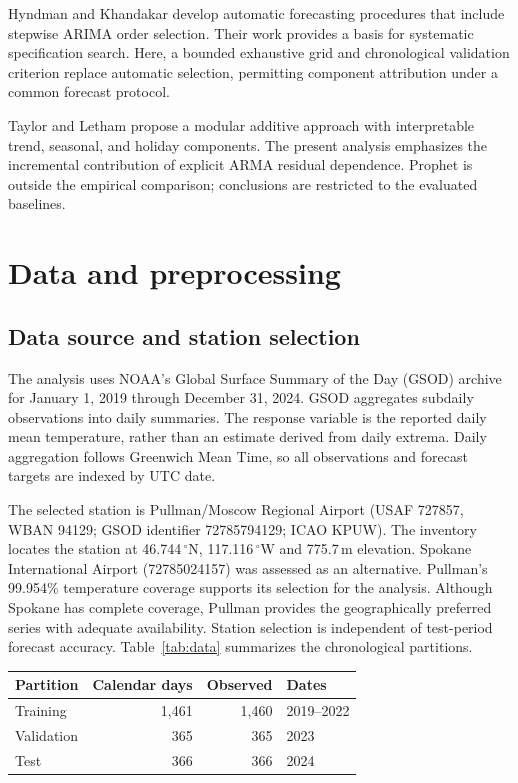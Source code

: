 \documentclass{article}
\begin{document}
Hyndman and Khandakar \cite{hyndman2008} develop automatic forecasting
procedures that include stepwise ARIMA order selection. Their work provides
a basis for systematic specification search. Here, a bounded exhaustive grid
and chronological validation criterion replace automatic selection, permitting
component attribution under a common forecast protocol.

Taylor and Letham \cite{taylor2018} propose a modular additive approach with
interpretable trend, seasonal, and holiday components. The present analysis
emphasizes the incremental contribution of explicit ARMA residual dependence.
Prophet is outside the empirical comparison; conclusions are restricted to
the evaluated baselines.

\newpage
\section{Data and preprocessing}
\subsection{Data source and station selection}
The analysis uses NOAA's Global Surface Summary of the Day (GSOD) archive
\cite{noaa} for January 1, 2019 through December 31, 2024. GSOD aggregates
subdaily observations into daily summaries. The response variable is the
reported daily mean temperature, rather than an estimate derived from daily
extrema. Daily aggregation follows Greenwich Mean Time, so all observations
and forecast targets are indexed by UTC date.

The selected station is Pullman/Moscow Regional Airport (USAF 727857, WBAN
94129; GSOD identifier 72785794129; ICAO KPUW). The inventory locates the
station at 46.744\,$^\circ$N, 117.116\,$^\circ$W and 775.7\,m elevation.
Spokane International Airport (72785024157) was assessed as an alternative.
Pullman's 99.954\% temperature coverage supports its selection for the
analysis. Although Spokane has complete coverage, Pullman provides the
geographically preferred series with adequate availability. Station selection
is independent of test-period forecast accuracy. Table~\ref{tab:data}
summarizes the chronological partitions.

\begin{center}
\label{tab:data}
\begin{tabular}{lrrl}
\toprule
Partition & Calendar days & Observed & Dates\\
\midrule
Training & 1,461 & 1,460 & 2019--2022\\
Validation & 365 & 365 & 2023\\
Test & 366 & 366 & 2024\\
\bottomrule
\end{tabular}
\end{center}
\end{document}
